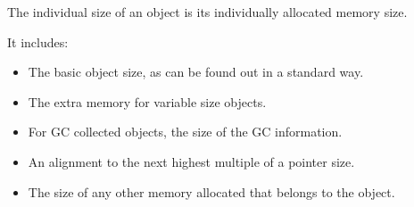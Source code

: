 {{{The individual size of an object is its individually allocated memory size.
 \par}
{\par 
It includes:
 \par}
\begin{itemize}
\item  The basic object size, as can be found out in a standard way.\item  The extra memory for variable size objects.\item  For GC collected objects, the size of the GC information.\item  An alignment to the next highest multiple of a pointer size.\item  The size of any other memory allocated that belongs to the object.\end{itemize}
{\par 

}}}
